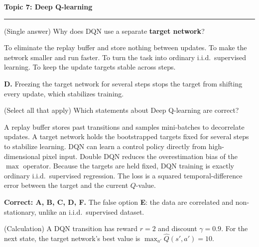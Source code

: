 \documentclass[answers,addpoints]{exam}
\newcommand{\topic}[2]{%
  \vspace{1.0\baselineskip}%
  \noindent\textbf{\large Topic #1: #2}\par
  \noindent\rule{\linewidth}{0.4pt}\par
  \vspace{0.4\baselineskip}}
\begin{document}
\begin{questions}
\topic{7}{Deep Q-learning}

\question[2] (Single answer) Why does DQN use a separate \textbf{target network}?
\begin{choices}
  \choice To eliminate the replay buffer and store nothing between updates.
  \choice To make the network smaller and run faster.
  \choice To turn the task into ordinary i.i.d.\ supervised learning.
  \CorrectChoice To keep the update targets stable across steps.
\end{choices}
\begin{solution}\textbf{D.} Freezing the target network for several steps stops the
target from shifting every update, which stabilizes training.\end{solution}

\question[3] (Select all that apply) Which statements about Deep Q-learning are
correct?
\begin{checkboxes}
  \CorrectChoice A replay buffer stores past transitions and samples mini-batches
        to decorrelate updates.
  \CorrectChoice A target network holds the bootstrapped targets fixed for several
        steps to stabilize learning.
  \CorrectChoice DQN can learn a control policy directly from high-dimensional
        pixel input.
  \CorrectChoice Double DQN reduces the overestimation bias of the $\max$ operator.
  \choice Because the targets are held fixed, DQN training is exactly ordinary
        i.i.d.\ supervised regression.
  \CorrectChoice The loss is a squared temporal-difference error between the target
        and the current $Q$-value.
\end{checkboxes}
\begin{solution}
\textbf{Correct: A, B, C, D, F.} The false option \textbf{E}: the data are
correlated and non-stationary, unlike an i.i.d.\ supervised dataset.
\end{solution}

\question[5] (Calculation) A DQN transition has reward $r=2$ and discount
$\gamma=0.9$. For the next state, the target network's best value is
$\max_{a'}\hat Q(s',a')=10$.
\end{questions}
\end{document}
